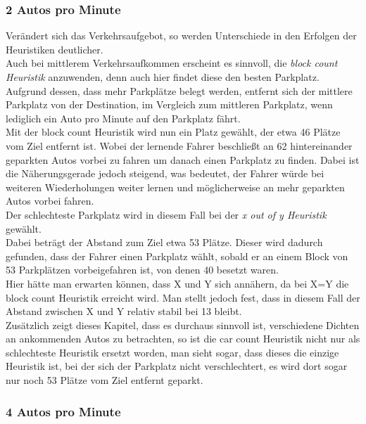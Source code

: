 \subsubsection{2 Autos pro Minute}

Verändert sich das Verkehrsaufgebot, so werden Unterschiede in den Erfolgen der Heuristiken deutlicher.\\
Auch bei mittlerem Verkehrsaufkommen erscheint es sinnvoll, die \emph{block count Heuristik} anzuwenden, denn auch hier findet diese den besten Parkplatz.
Aufgrund dessen, dass mehr Parkplätze belegt werden, entfernt sich der mittlere Parkplatz von der Destination, im Vergleich zum mittleren Parkplatz, wenn lediglich ein Auto pro Minute auf den Parkplatz fährt.\\
Mit der block count Heuristik wird nun ein Platz gewählt, der etwa 46 Plätze vom Ziel entfernt ist. Wobei der lernende Fahrer beschließt an 62 hintereinander geparkten Autos vorbei zu fahren um danach einen Parkplatz zu finden. Dabei ist die Näherungsgerade jedoch steigend, was bedeutet, der Fahrer würde bei weiteren Wiederholungen weiter lernen und möglicherweise an mehr geparkten Autos vorbei fahren.\\
Der schlechteste Parkplatz wird in diesem Fall bei der  \emph{x out of y Heuristik} gewählt. \\
Dabei beträgt der Abstand zum Ziel etwa 53 Plätze. Dieser wird dadurch gefunden, dass der Fahrer einen Parkplatz wählt, sobald er an einem Block von 53 Parkplätzen vorbeigefahren ist, von denen 40 besetzt waren.\\
Hier hätte man erwarten können, dass X und Y sich annähern, da bei X=Y die block count Heuristik erreicht wird. Man stellt jedoch fest, dass in diesem Fall der Abstand zwischen X und Y relativ stabil bei 13 bleibt.\\
Zusätzlich zeigt dieses Kapitel, dass es durchaus sinnvoll ist, verschiedene Dichten an ankommenden Autos zu betrachten, so ist die car count Heuristik nicht nur als schlechteste Heuristik ersetzt worden, man sieht sogar, dass dieses die einzige Heuristik ist, bei der sich der Parkplatz nicht verschlechtert, es wird dort sogar nur noch 53 Plätze vom Ziel entfernt geparkt.

\subsubsection{4 Autos pro Minute} 

